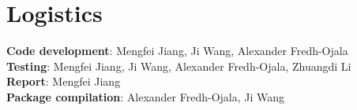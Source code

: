 \documentclass{article}\usepackage[]{graphicx}\usepackage[]{color}
\begin{document}
\section{Logistics}
\textbf{Code development}: Mengfei Jiang, Ji Wang, Alexander Fredh-Ojala\\
\textbf{Testing}: Mengfei Jiang, Ji Wang, Alexander Fredh-Ojala, Zhuangdi Li\\
\textbf{Report}: Mengfei Jiang\\
\textbf{Package compilation}: Alexander Fredh-Ojala, Ji Wang\\
\end{document}
